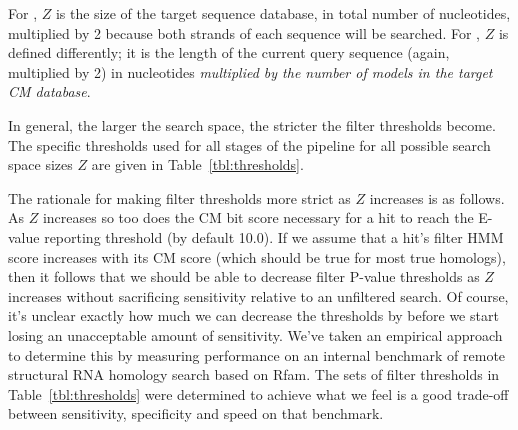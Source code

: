 For , $Z$ is the size of the target sequence database,
in total number of nucleotides, multiplied by 2 because both strands
of each sequence will be searched. For , $Z$ is defined
differently; it is the length of the current query sequence (again,
multiplied by 2) in nucleotides \emph{multiplied by the number of
models in the target CM database}. 

In general, the larger the search space, the stricter the filter
thresholds become. The specific thresholds used for all stages of the
pipeline for all possible search space sizes $Z$ are given in
Table~\ref{tbl:thresholds}.

The rationale for making filter thresholds more strict as $Z$
increases is as follows. As $Z$ increases so too does the CM bit score
necessary for a hit to reach the E-value reporting threshold (by
default 10.0). If we assume that a hit's filter HMM score increases
with its CM score (which should be true for most true homologs), then it
follows that we should be able to decrease filter P-value thresholds
as $Z$ increases without sacrificing sensitivity relative to an
unfiltered search. Of course, it's unclear exactly how much we can
decrease the thresholds by before we start losing an unacceptable
amount of sensitivity. We've taken an empirical approach to determine
this by measuring performance on an internal benchmark of remote
structural RNA homology search based on Rfam. The sets of filter
thresholds in Table~\ref{tbl:thresholds} were determined to achieve
what we feel is a good trade-off between sensitivity, specificity and
speed on that benchmark.

